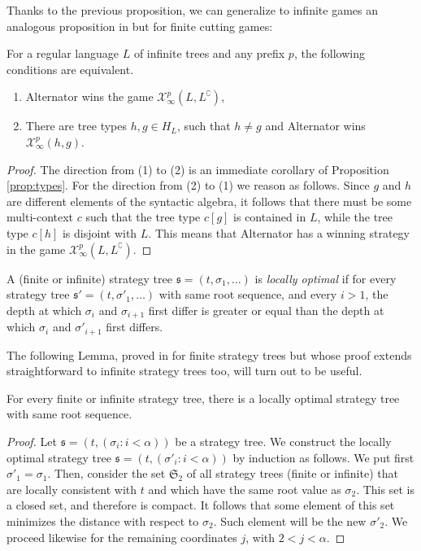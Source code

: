  Thanks to the previous proposition, we can generalize to infinite games an analogous proposition in \cite{bp} but for finite cutting games:
\begin{proposition}\label{prop:tree_to_types}
 For a regular language $L$ of infinite trees and any prefix $p$, the following conditions are equivalent.
 \begin{enumerate}
\item Alternator wins the game $\mathcal{X}^p_\infty(L, L^\complement)$, 
 \item  There are tree types $h, g\in H_L$, such that $h\neq g$ and Alternator wins $\mathcal{X}^p_\infty(h, g)$.
 \end{enumerate}
\end{proposition}
\begin{proof}
The direction from (1) to (2) is an immediate corollary of Proposition \ref{prop:types}.
For the direction from (2) to (1) we reason as follows. Since $g$ and $h$ are different elements of the syntactic algebra, it follows that there must be some multi-context $c$ such that the tree type $c[g]$ is contained in $L$, while the tree type $c[h]$ is disjoint with $L$. 
This means that Alternator has a winning strategy in the game $\mathcal{X}^p_\infty(L, L^\complement)$.
\end{proof}


A (finite or infinite) strategy tree $\mathfrak{s}=(t, \sigma_1, \dots)$ is \emph{locally optimal} if for every strategy tree $\mathfrak{s}'=(t, \sigma'_1, \dots)$ with same root sequence, and every $i>1$, the depth at which $\sigma_i$ and $\sigma_{i+1}$ first differ is greater or equal than the depth at which $\sigma_i$ and $\sigma'_{i+1}$ first differs.





The following Lemma, proved in \cite{bp} for finite strategy trees but whose proof extends straightforward to infinite strategy trees too, will turn out to be useful.%

\begin{lemma}\label{lemma:locallyoptimal}
For every finite or infinite strategy tree, there is a locally optimal strategy tree with same root sequence.
\end{lemma}
\begin{proof} Let $\mathfrak{s}=(t, (\sigma_i : i < \alpha))$ be a strategy tree. We construct the locally optimal strategy tree $\mathfrak{s}=(t, (\sigma'_i : i < \alpha))$ by induction as follows. We put first $\sigma'_1=\sigma_1$. Then, consider the set $\mathfrak{S}_2$ of all strategy trees (finite or infinite) that are locally consistent with $t$ and which have the same root value as $\sigma_2$. This set is a closed set, and therefore is compact. It follows that some element of this set minimizes the distance with respect to $\sigma_2$. Such element will be the new $\sigma'_2$. We proceed likewise for the remaining coordinates $j$, with $2 < j < \alpha$.
\end{proof}

